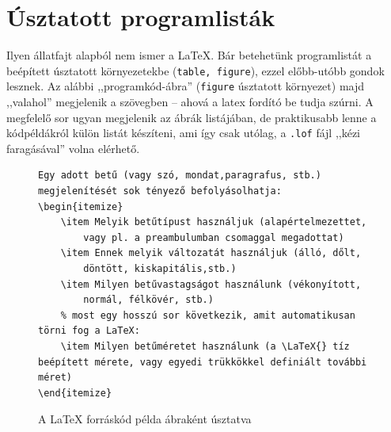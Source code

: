 \documentclass{article}
\begin{document}
\section{Úsztatott programlisták}

Ilyen állatfajt alapból nem ismer a  \LaTeX{}. Bár betehetünk programlistát a beépített úsztatott környezetekbe (\verb!table, figure!), ezzel előbb-utóbb gondok lesznek. Az alábbi ,,programkód-ábra'' (\verb!figure! úsztatott környezet) majd ,,valahol'' megjelenik a szövegben -- ahová a latex fordító be tudja szúrni. A megfelelő sor ugyan megjelenik az ábrák listájában, de praktikusabb lenne a kódpéldákról külön listát készíteni, ami így csak utólag, a \verb!.lof! fájl ,,kézi faragásával'' volna elérhető.

\begin{figure}[!h]
{\centering
\begin{lstlisting}[language={[LaTeX]TeX}, frame=TRBL]
% most egy hosszú sor következik, amit automatikusan törni fog a LaTeX:
Egy adott betű (vagy szó, mondat,paragrafus, stb.) megjelenítését sok tényező befolyásolhatja:
\begin{itemize}
	\item Melyik betűtípust használjuk (alapértelmezettet,
		vagy pl. a preambulumban csomaggal megadottat)
	\item Ennek melyik változatát használjuk (álló, dőlt,
		döntött, kiskapitális,stb.)
	\item Milyen betűvastagságot használunk (vékonyított,
		normál, félkövér, stb.)
	% most egy hosszú sor következik, amit automatikusan törni fog a LaTeX:
	\item Milyen betűméretet használunk (a \LaTeX{} tíz beépített mérete, vagy egyedi trükkökkel definiált további méret)
\end{itemize}
\end{lstlisting}
\caption{A   \LaTeX{} forráskód példa ábraként úsztatva}
}
\end{figure}
\end{document}
